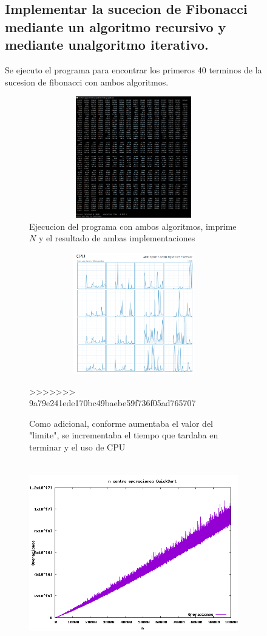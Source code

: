 \documentclass[spanish]{article}
\begin{document}
\begin{figure}[h!]
	\subsection{Implementar la sucecion de Fibonacci mediante un algoritmo recursivo y mediante unalgoritmo iterativo.}
	Se ejecuto el programa para encontrar los primeros 40 terminos de la sucesion de fibonacci con ambos algoritmos.			
	\begin{figure}[h!]
		\centering
		\includegraphics[width=400px,height=200px]{ejecucionPrimeraParte}
		\caption{Ejecucion del programa con ambos algoritmos, imprime $N$ y el resultado de ambas implementaciones}
	\end{figure}
	\begin{figure}[H]
		\centering
		\includegraphics[width=400px,height=200px]{cpu}
		\caption{Como adicional, conforme aumentaba el valor del "limite", se incrementaba el tiempo que tardaba en terminar y el uso de CPU}
>>>>>>> 9a79e241ede170bc49baebe59f736f05ad765707
	\end{figure}
	\begin{figure}[H]
		\centering
		\includegraphics[width=400px,height=300px]{grafica1}

\end{figure}
\end{figure}
\end{document}
